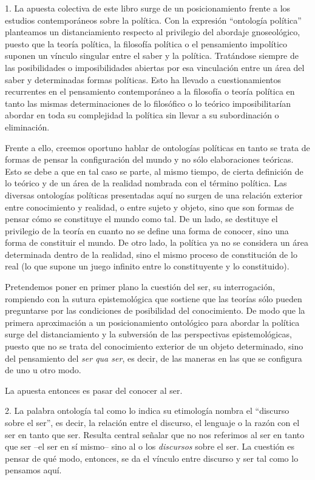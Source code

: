 \documentclass{book}
\begin{document}
1. La apuesta colectiva de este libro surge de un posicionamiento frente a
los estudios contemporáneos sobre la política. Con la expresión
\enquote{ontología política} planteamos un distanciamiento respecto al
privilegio del abordaje gnoseológico, puesto que la teoría política, la
filosofía política o el pensamiento impolítico suponen un vínculo
singular entre el saber y la política. Tratándose siempre de las
posibilidades o imposibilidades abiertas por esa vinculación entre un
área del saber y determinadas formas políticas. Esto ha llevado a
cuestionamientos recurrentes en el pensamiento contemporáneo a la
filosofía o teoría política en tanto las mismas determinaciones de lo
filosófico o lo teórico imposibilitarían abordar en toda su complejidad
la política sin llevar a su subordinación o eliminación.

Frente a ello, creemos oportuno hablar de ontologías políticas en tanto
se trata de formas de pensar la configuración del mundo y no sólo
elaboraciones teóricas. Esto se debe a que en tal caso se parte, al
mismo tiempo, de cierta definición de lo teórico y de un área de la
realidad nombrada con el término política. Las diversas ontologías
políticas presentadas aquí no surgen de una relación exterior entre
conocimiento y realidad, o entre sujeto y objeto, sino que son formas de
pensar cómo se constituye el mundo como tal. De un lado, se destituye el
privilegio de la teoría en cuanto no se define una forma de conocer,
sino una forma de constituir el mundo. De otro lado, la política ya no
se considera un área determinada dentro de la realidad, sino el mismo
proceso de constitución de lo real (lo que supone un juego infinito
entre lo constituyente y lo constituido).

Pretendemos poner en primer plano la cuestión del ser, su interrogación,
rompiendo con la sutura epistemológica que sostiene que las teorías sólo
pueden preguntarse por las condiciones de posibilidad del conocimiento.
De modo que la primera aproximación a un posicionamiento ontológico para
abordar la política surge del distanciamiento y la subversión de las
perspectivas epistemológicas, puesto que no se trata del conocimiento
exterior de un objeto determinado, sino del pensamiento del \emph{ser
qua ser}, es decir, de las maneras en las que se configura de uno u otro
modo.

La apuesta entonces es pasar del conocer al ser.

2. La palabra ontología tal como lo indica su etimología nombra el
\enquote{discurso sobre el ser}, es decir, la relación entre el discurso, el
lenguaje o la razón con el ser en tanto que ser. Resulta central señalar
que no nos referimos al ser en tanto que ser --el ser en sí mismo-- sino
al o los \emph{discursos} sobre el ser. La cuestión es pensar de qué
modo, entonces, se da el vínculo entre discurso y ser tal como lo
pensamos aquí.
\end{document}
